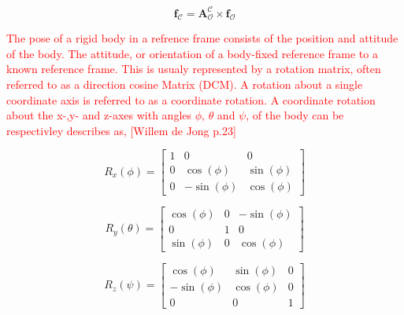 \begin{equation}
    \mathbf{f}_{\mathcal{C}} = \mathbf{A}_{\mathcal{O}}^{\mathcal{C}}\times\mathbf{f}_{\mathcal{O}}
\end{equation}





\label{sec:modrigid}

\label{sec:kinematics}

\textcolor{red}{The pose of a rigid body in a refrence frame consists of the position and attitude of the body. The attitude, or orientation of a body-fixed reference frame to a
known reference frame. This is usualy represented by a rotation matrix, often referred to as a direction cosine Matrix (DCM). A rotation about a single coordinate axis
is referred to as a coordinate rotation. A coordinate rotation about the x-,y- and z-axes with angles $\phi$, $\theta$ and $\psi$, of the body can be respectivley
describes as, [Willem de Jong p.23]}

\begin{equation}
    R_x(\phi) = \begin{bmatrix} 
        1 & 0 & 0 \\
        0 & \cos(\phi) & \sin(\phi) \\
        0 & -\sin(\phi) & \cos(\phi)
    \end{bmatrix}
    \label{Eq:3.1}
\end{equation}

\begin{equation}
    R_y(\theta) = \begin{bmatrix} 
        \cos(\phi) & 0 & -\sin(\phi) \\
        0 & 1 & 0 \\
        \sin(\phi) & 0  & \cos(\phi)
    \end{bmatrix}
    \label{Eq:3.2}
\end{equation}

\begin{equation}
    R_z(\psi) = \begin{bmatrix} 
        \cos(\phi) & \sin(\phi) & 0 \\
        -\sin(\phi) & \cos(\phi) & 0 \\
        0 & 0 & 1
    \end{bmatrix}
    \label{Eq:3.3}
\end{equation}

